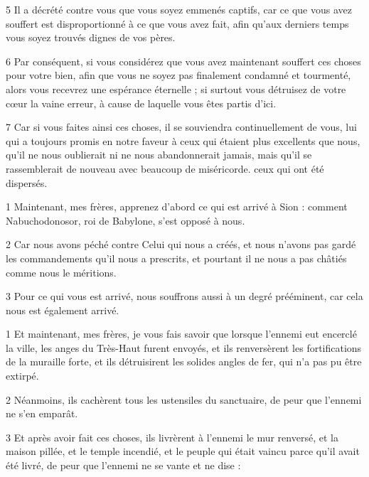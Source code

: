 \par 5 Il a décrété contre vous que vous soyez emmenés captifs, car ce que vous avez souffert est disproportionné à ce que vous avez fait, afin qu'aux derniers temps vous soyez trouvés dignes de vos pères.

\par 6 Par conséquent, si vous considérez que vous avez maintenant souffert ces choses pour votre bien, afin que vous ne soyez pas finalement condamné et tourmenté, alors vous recevrez une espérance éternelle ; si surtout vous détruisez de votre cœur la vaine erreur, à cause de laquelle vous êtes partis d'ici.

\par 7 Car si vous faites ainsi ces choses, il se souviendra continuellement de vous, lui qui a toujours promis en notre faveur à ceux qui étaient plus excellents que nous, qu'il ne nous oublierait ni ne nous abandonnerait jamais, mais qu'il se rassemblerait de nouveau avec beaucoup de miséricorde. ceux qui ont été dispersés.


\par 1 Maintenant, mes frères, apprenez d'abord ce qui est arrivé à Sion : comment Nabuchodonosor, roi de Babylone, s'est opposé à nous.

\par 2 Car nous avons péché contre Celui qui nous a créés, et nous n'avons pas gardé les commandements qu'il nous a prescrits, et pourtant il ne nous a pas châtiés comme nous le méritions.

\par 3 Pour ce qui vous est arrivé, nous souffrons aussi à un degré prééminent, car cela nous est également arrivé.


\par 1 Et maintenant, mes frères, je vous fais savoir que lorsque l'ennemi eut encerclé la ville, les anges du Très-Haut furent envoyés, et ils renversèrent les fortifications de la muraille forte, et ils détruisirent les solides angles de fer, qui n'a pas pu être extirpé.

\par 2 Néanmoins, ils cachèrent tous les ustensiles du sanctuaire, de peur que l'ennemi ne s'en emparât.

\par 3 Et après avoir fait ces choses, ils livrèrent à l'ennemi le mur renversé, et la maison pillée, et le temple incendié, et le peuple qui était vaincu parce qu'il avait été livré, de peur que l'ennemi ne se vante et ne dise :

